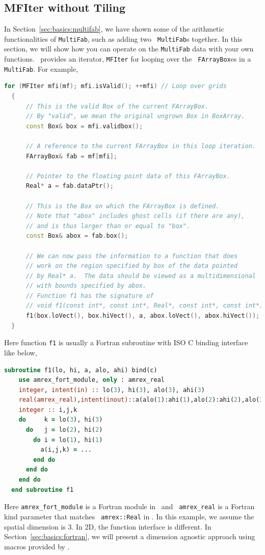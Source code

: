 {{{\subsection{MFIter without Tiling}
\label{sec:basics:mfiter:notiling}

In Section~\ref{sec:basics:multifab}, we have shown some of the
arithmetic functionalities of {\tt MultiFab}, such as adding two {\tt
  MultiFab}s together.  In this section, we will show how you can
operate on the {\tt MultiFab} data with your own functions.  \amrex\
provides an iterator, {\tt MFIter} for looping over the {\tt
  FArrayBox}es in a {\tt MultiFab}.  For example,
\begin{lstlisting}[language=cpp]
  for (MFIter mfi(mf); mfi.isValid(); ++mfi) // Loop over grids
  {
      // This is the valid Box of the current FArrayBox.
      // By "valid", we mean the original ungrown Box in BoxArray.
      const Box& box = mfi.validbox();

      // A reference to the current FArrayBox in this loop iteration.
      FArrayBox& fab = mf[mfi];

      // Pointer to the floating point data of this FArrayBox.
      Real* a = fab.dataPtr();

      // This is the Box on which the FArrayBox is defined.
      // Note that "abox" includes ghost cells (if there are any),
      // and is thus larger than or equal to "box".
      const Box& abox = fab.box();

      // We can now pass the information to a function that does
      // work on the region specified by box of the data pointed
      // by Real* a.  The data should be viewed as a multidimensional
      // with bounds specified by abox.
      // Function f1 has the signature of
      // void f1(const int*, const int*, Real*, const int*, const int*);
      f1(box.loVect(), box.hiVect(), a, abox.loVect(), abox.hiVect());
  }
\end{lstlisting}
Here function {\tt f1} is usually a Fortran subroutine with ISO C
binding interface like below,
\begin{lstlisting}[language=fortran]
  subroutine f1(lo, hi, a, alo, ahi) bind(c)
    use amrex_fort_module, only : amrex_real
    integer, intent(in) :: lo(3), hi(3), alo(3), ahi(3)
    real(amrex_real),intent(inout)::a(alo(1):ahi(1),alo(2):ahi(2),alo(3):ahi(3))
    integer :: i,j,k
    do     k = lo(3), hi(3)
      do   j = lo(2), hi(2)
        do i = lo(1), hi(1)
          a(i,j,k) = ...
        end do
      end do
    end do
  end subroutine f1
\end{lstlisting}
Here {\tt amrex\_fort\_module} is a Fortran module in \amrex\ and {\tt
  amrex\_real} is a Fortran kind parameter that matches {\tt
  amrex::Real} in \cpp.  In this example, we assume the spatial
dimension is 3.  In 2D, the function interface is different.  In
Section~\ref{sec:basics:fortran}, we will present a dimension agnostic
approach using macros provided by \amrex.

}}}
